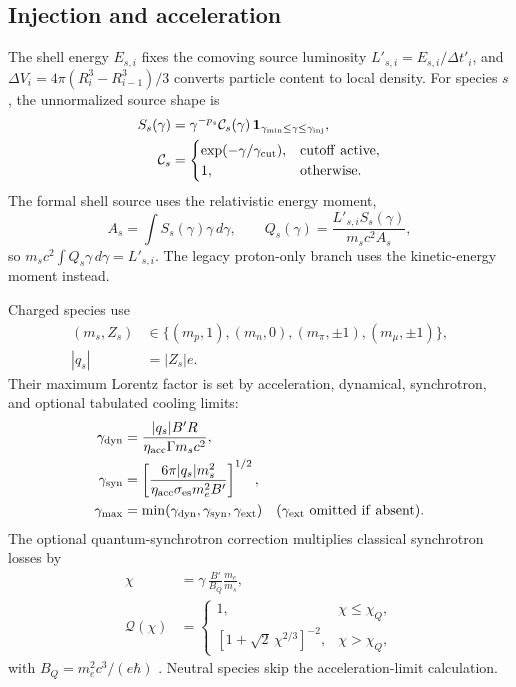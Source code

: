 \documentclass[twocolumn]{aastex702}
\begin{document}
\subsection{Injection and acceleration}

The shell energy \(E_{s,i}\) fixes the comoving source luminosity
\(L'_{s,i}=E_{s,i}/\Delta t'_i\), and
\(\Delta V_i=4\pi(R_i^3-R_{i-1}^3)/3\) converts particle content to local density.
For species \(s\), the unnormalized source shape is
\begin{equation}
\begin{aligned}
S_s(\gamma)&=
\gamma^{-p_s}\mathcal C_s(\gamma)\,
\mathbf{1}_{\gamma_{\min}\le\gamma\le\gamma_{\rm inj}},\\
\mathcal C_s&=
\begin{cases}
\exp(-\gamma/\gamma_{\rm cut}),&{\rm cutoff\ active},\\
1,&{\rm otherwise}.
\end{cases}
\end{aligned}
\end{equation}
The formal shell source uses the relativistic energy moment,
\begin{equation}
A_s=\int S_s(\gamma)\gamma\,d\gamma,\qquad
Q_s(\gamma)=\frac{L'_{s,i}S_s(\gamma)}{m_sc^2A_s},
\end{equation}
so \(m_sc^2\int Q_s\gamma\,d\gamma=L'_{s,i}\).  The legacy proton-only branch
uses the kinetic-energy moment instead.

Charged species use
\begin{equation}
\begin{aligned}
(m_s,Z_s)&\in\{(m_p,1),(m_n,0),
(m_\pi,\pm1),(m_\mu,\pm1)\},\\
|q_s|&=|Z_s|e .
\end{aligned}
\end{equation}
Their maximum Lorentz factor is set by acceleration, dynamical, synchrotron, and
optional tabulated cooling limits:
\begin{equation}
\begin{aligned}
\gamma_{\rm dyn}
&=\frac{|q_s|B'R}{\eta_{\rm acc}\Gamma m_sc^2},\\
\gamma_{\rm syn}
&=\left[\frac{6\pi |q_s|m_s^2}
{\eta_{\rm acc}\sigma_{\rm es}m_e^2B'}\right]^{1/2},\\
\gamma_{\max}&=\min(\gamma_{\rm dyn},\gamma_{\rm syn},\gamma_{\rm ext})
\quad(\gamma_{\rm ext}\ {\rm omitted\ if\ absent}).
\end{aligned}
\end{equation}
The optional quantum-synchrotron correction multiplies classical synchrotron
losses by
\begin{equation}
\begin{aligned}
\chi&=\gamma\,\frac{B'}{B_Q}\frac{m_e}{m_s},\\
\mathcal Q(\chi)&=
\begin{cases}
1, & \chi\le\chi_Q,\\
\left[1+\sqrt{2}\,\chi^{2/3}\right]^{-2},&\chi>\chi_Q,
\end{cases}
\end{aligned}
\end{equation}
with \(B_Q=m_e^2c^3/(e\hbar)\) \citep{Klinger2024AM3}.  Neutral species skip the
acceleration-limit calculation.
\end{document}
